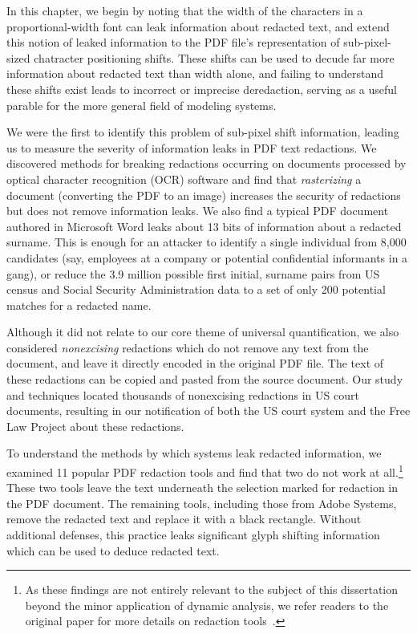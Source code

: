 In this chapter, we begin by noting that the width of the characters in a proportional-width font can leak information about redacted text, and extend this notion of leaked information to the PDF file's representation of sub-pixel-sized chatracter positioning shifts.
These shifts can be used to decude far more information about redacted text than width alone, and failing to understand these shifts exist leads to incorrect or imprecise deredaction, serving as a useful parable for the more general field of modeling systems.

We were the first to identify this problem of sub-pixel shift information, leading us to measure the severity of information leaks in PDF text redactions.
We discovered methods for breaking redactions occurring on documents processed by optical character recognition (OCR) software and find that \emph{rasterizing} a document (converting the PDF to an image) increases the security of redactions but does not remove information leaks.
We also find a typical PDF document authored in Microsoft Word leaks about 13 bits of information about a redacted surname. 
This is enough for an attacker to identify a single individual from 8,000 candidates (say, employees at a company or potential confidential informants in a gang), or reduce the 3.9 million possible first initial, surname pairs from US census and Social Security Administration data to a set of only 200 potential matches for a redacted name.

Although it did not relate to our core theme of universal quantification, we also considered \emph{nonexcising} redactions which do not remove any text from the document, and leave it directly encoded in the original PDF file.
The text of these redactions can be copied and pasted from the source document.
Our study and techniques located thousands of nonexcising redactions in US court documents, resulting in our notification of both the US court system and the Free Law Project about these redactions.

To understand the methods by which systems leak redacted information, we examined 11 popular PDF redaction tools and find that two do not work at all.\footnote{As these findings are not entirely relevant to the subject of this dissertation beyond the minor application of dynamic analysis, we refer readers to the original paper for more details on redaction tools~\cite{bland2023story}.}
These two tools leave the text underneath the selection marked for redaction in the PDF document.
The remaining tools, including those from Adobe Systems, remove the redacted text and replace it with a black rectangle.
Without additional defenses, this practice leaks significant glyph shifting information which can be used to deduce redacted text.

